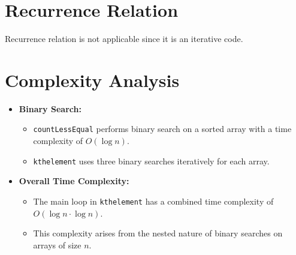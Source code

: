 \documentclass[8pt]{article}
\begin{document}
\vspace{-1em}

\section{Recurrence Relation}
    \fontsize{12}{8}\selectfont Recurrence relation is not applicable since it is an iterative code.

\section{Complexity Analysis}

\begin{itemize}
    \item \textbf{Binary Search:}
    \begin{itemize}
        \item \texttt{countLessEqual} performs binary search on a sorted array with a time complexity of $O(\log n)$.
        \item \texttt{kthelement} uses three binary searches iteratively for each array.
    \end{itemize}
    
    \item \textbf{Overall Time Complexity:}
    \begin{itemize}
        \item The main loop in \texttt{kthelement} has a combined time complexity of $O(\log n \cdot \log n)$.
        \item This complexity arises from the nested nature of binary searches on arrays of size $n$.
    \end{itemize}
\end{itemize}

\end{document}
